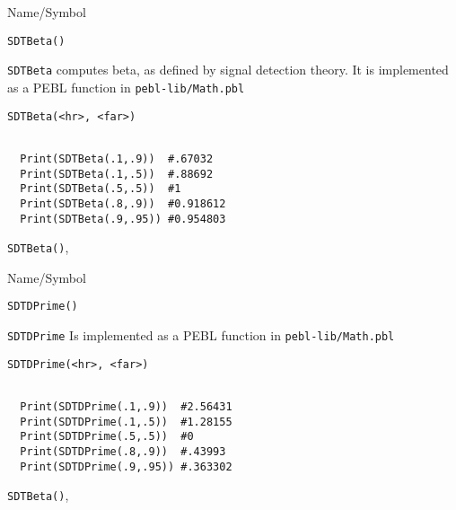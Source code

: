 \rl


\begin{desc}{Name/Symbol}
\item[Name/Symbol] 	\verb+SDTBeta()+

\item[Description] \verb+SDTBeta+ computes beta, as defined by signal detection theory.  It is implemented as a PEBL function in
  \verb+pebl-lib/Math.pbl+

\item[Usage]        	
\begin{verbatim}
SDTBeta(<hr>, <far>)
\end{verbatim}

\item[Example] 	
\begin{verbatim}

  Print(SDTBeta(.1,.9))  #.67032
  Print(SDTBeta(.1,.5))  #.88692
  Print(SDTBeta(.5,.5))  #1
  Print(SDTBeta(.8,.9))  #0.918612
  Print(SDTBeta(.9,.95)) #0.954803
\end{verbatim}

\item[See Also]\verb+SDTBeta()+,
\end{desc}

\rl

\begin{desc}{Name/Symbol}
\item[Name/Symbol] 	\verb+SDTDPrime()+

\item[Description] \verb+SDTDPrime+  Is implemented as a PEBL function in
  \verb+pebl-lib/Math.pbl+

\item[Usage]        	
\begin{verbatim}
SDTDPrime(<hr>, <far>)
\end{verbatim}

\item[Example] 	
\begin{verbatim}

  Print(SDTDPrime(.1,.9))  #2.56431
  Print(SDTDPrime(.1,.5))  #1.28155
  Print(SDTDPrime(.5,.5))  #0
  Print(SDTDPrime(.8,.9))  #.43993
  Print(SDTDPrime(.9,.95)) #.363302

\end{verbatim}

\item[See Also]\verb+SDTBeta()+,
\end{desc}

\rl




